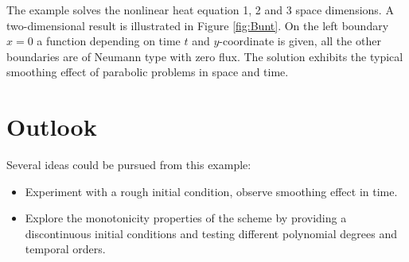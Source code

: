 \documentclass[a4paper,12pt]{article}
\begin{document}
The example solves the nonlinear heat equation 1, 2 and 3 space dimensions.
A two-dimensional result is illustrated in Figure \ref{fig:Bunt}. On the left boundary 
$x=0$ a function depending on time $t$ and $y$-coordinate is given, all the other
boundaries are of Neumann type with zero flux. The solution exhibits the 
typical smoothing effect of parabolic problems in space and time.

\section{Outlook}

Several ideas could be pursued from this example:
\begin{itemize}
\item Experiment with a rough initial condition, observe 
smoothing effect in time.
\item Explore the monotonicity properties of the scheme by
providing a discontinuous initial conditions and testing different
polynomial degrees and temporal orders.
\end{itemize}



\end{document}
